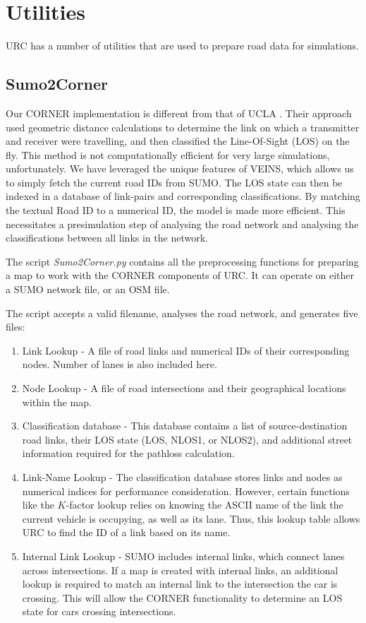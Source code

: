 \section{Utilities}

URC has a number of utilities that are used to prepare road data for simulations.

\subsection{Sumo2Corner}\label{subsect:sumo2corner}

Our CORNER implementation is different from that of UCLA \cite{giordano_corner:_2011}. Their approach used geometric distance calculations to determine the link on which a transmitter and receiver were travelling, and then classified the Line-Of-Sight (LOS) on the fly. This method is not computationally efficient for very large simulations, unfortunately. We have leveraged the unique features of VEINS, which allows us to simply fetch the current road IDs from SUMO. The LOS state can then be indexed in a database of link-pairs and corresponding classifications. By matching the textual Road ID to a numerical ID, the model is made more efficient. This necessitates a presimulation step of analysing the road network and analysing the classifications between all links in the network.

The script \textit{Sumo2Corner.py} contains all the preprocessing functions for preparing a map to work with the CORNER components of URC. It can operate on either a SUMO network file, or an OSM file.

The script accepts a valid filename, analyses the road network, and generates five files:
\begin{enumerate}
 \item Link Lookup - A file of road links and numerical IDs of their corresponding nodes. Number of lanes is also included here.
 \item Node Lookup - A file of road intersections and their geographical locations within the map.
 \item Classification database - This database contains a list of source-destination road links, their LOS state (LOS, NLOS1, or NLOS2), and additional street information required for the pathloss calculation.
 \item Link-Name Lookup - The classification database stores links and nodes as numerical indices for performance consideration. However, certain functions like the $K$-factor lookup relies on knowing the ASCII name of the link the current vehicle is occupying, as well as its lane. Thus, this lookup table allows URC to find the ID of a link based on its name.
 \item Internal Link Lookup - SUMO includes internal links, which connect lanes across intersections. If a map is created with internal links, an additional lookup is required to match an internal link to the intersection the car is crossing. This will allow the CORNER functionality to determine an LOS state for cars crossing intersections.
\end{enumerate}

